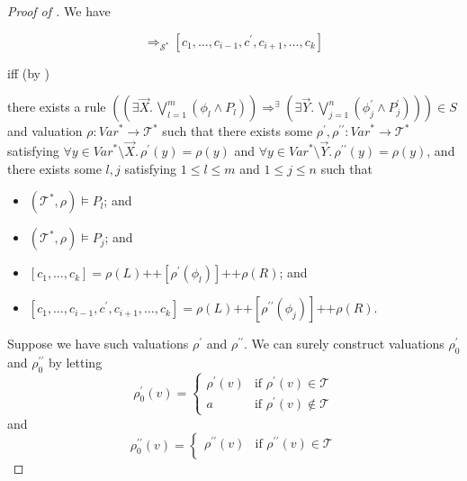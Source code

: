 \documentclass{article}
\newenvironment{proofenv}
  {
    \VerbatimEnvironment\begin{tcolorbox}[colback=black!0!white] %
  }
  {
   \end{tcolorbox}
  }
\begin{document}
\begin{proof}[Proof of ]
We have
\begin{proofenv}
\begin{equation*}
[c_1,\ldots,c_k] \Rightarrow_{\mathcal{S}^*} [c_1, \ldots, c_{i-1}, c^\prime, c_{i+1}, \ldots, c_k]    
\end{equation*}
\end{proofenv}
iff (by )
\begin{proofenv}
there exists a rule $((\exists \vec{X}.\, \bigvee_{l=1}^{m} (\phi_l \land P_l)) \Rightarrow^\exists (\exists \vec{Y}.\, \bigvee_{j=1}^{n} (\phi^\prime_j \land P^\prime_j))) \in S$
and valuation $\rho : \mathit{Var}^* \to \mathcal{T}^*$ such that
there exists some $\rho^\prime,\rho^{\prime\prime} : \mathit{Var}^* \to \mathcal{T}^*$
satisfying $\forall y \in \mathit{Var}^* \setminus \vec{X}.\, \rho^\prime(y) = \rho(y)$
and $\forall y \in \mathit{Var}^* \setminus \vec{Y}.\, \rho^{\prime\prime}(y) = \rho(y)$,
and there exists some $l,j$ satisfying $1 \leq l \leq m$ and $1 \leq j \leq n$ such that
\begin{itemize}
    \item $(\mathcal{T}^*, \rho) \vDash P_l$; and
    \item $(\mathcal{T}^*, \rho) \vDash P_j$; and
    \item $[c_1,\ldots,c_k] = \rho(L) \texttt{++} [\rho^\prime(\phi_l)] \texttt{++} \rho(R)$; and
    \item $[c_1, \ldots, c_{i-1}, c^\prime, c_{i+1}, \ldots, c_k] = \rho(L) \texttt{++} [\rho^{\prime\prime}(\phi_j)] 
    \texttt{++} \rho(R)$.
\end{itemize}
\end{proofenv}
Suppose we have such valuations $\rho^\prime$ and $\rho^{\prime\prime}$.
We can surely construct valuations $\rho_0^\prime$ and $\rho_0^{\prime\prime}$ by letting
\begin{equation*}
\rho_0^\prime(v)=
    \begin{cases}
        \rho^\prime(v) & \text{if } \rho^\prime(v) \in \mathcal{T}\\
        a & \text{if } \rho^\prime(v) \not\in \mathcal{T}
    \end{cases}
\end{equation*}
and
\begin{equation*}
\rho_0^{\prime\prime}(v)=
    \begin{cases}
        \rho^{\prime\prime}(v) & \text{if } \rho^{\prime\prime}(v) \in \mathcal{T}\\

\end{cases}
\end{equation*}
\end{proof}
\end{document}
